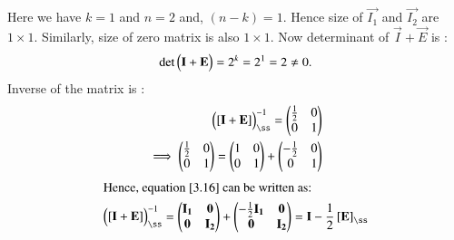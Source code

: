 \documentclass[journal,12pt,twocolumn]{IEEEtran}
\begin{document}
Here we have $k = 1$ and $ n = 2 $ and, $(n - k) = 1$. Hence size of  $\vec{I_1}$ and $\vec{I_2}$  are $ 1 \times 1$. Similarly, size of zero matrix is also $1 \times 1$.
Now determinant of $\vec{I} + \vec{E} $ is :
\begin{align}
\text{det}\begin{pmatrix}\mathbf{I} + \mathbf{E}\end{pmatrix} = 2^k=  2 ^1 = 2 \neq 0.
\end{align}
Inverse of the matrix is :
\begin{align}
  \myvec{ \left[ \vec{I} + \vec{E}\right]}_{\ss}^{-1} = \myvec{\frac{1}{2} & 0 \\ 0 & 1}\\
\implies \myvec{\frac{1}{2} & 0 \\ 0 & 1}  =\myvec{1 & 0 \\ 0 & 1} +  \myvec{ -\frac{1}{2} & 0 \\ 0 & 1} \label{3.16}
\end{align}
\begin{align}
\intertext{Hence, equation \eqref{3.16} can be written as:}
   \myvec{ \left[ \vec{I} + \vec{E}\right]}_{\ss}^{-1}  = \myvec{\vec{I_1} & \vec{0} \\
	\vec{0} & \vec{I_2} } +  \myvec{-\frac{1}{2}\vec{I_1} & \vec{0} \\
	\vec{0} & \vec{I_2}} = \vec{I} - \frac{1}{2}\left[\vec{E}\right]_{\ss}
\end{align}



















	
	
\end{document}
